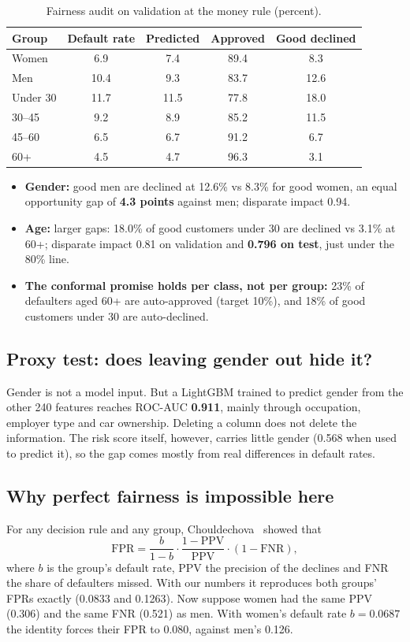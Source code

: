 \documentclass[conference,10pt]{IEEEtran}
\begin{document}
\begin{table}[t]
\centering\small
\caption{Fairness audit on validation at the money rule (percent).}
\label{tab:audit}
\setlength{\tabcolsep}{3pt}
\begin{tabular}{@{}lcccc@{}}
\toprule
Group & Default rate & Predicted & Approved & Good declined \\
\midrule
Women & 6.9 & 7.4 & 89.4 & 8.3 \\
Men & 10.4 & 9.3 & 83.7 & 12.6 \\
\midrule
Under 30 & 11.7 & 11.5 & 77.8 & 18.0 \\
30--45 & 9.2 & 8.9 & 85.2 & 11.5 \\
45--60 & 6.5 & 6.7 & 91.2 & 6.7 \\
60+ & 4.5 & 4.7 & 96.3 & 3.1 \\
\bottomrule
\end{tabular}
\end{table}

\begin{itemize}
\item \textbf{Gender:} good men are declined at 12.6\% vs 8.3\% for good women, an equal
opportunity gap of \textbf{4.3 points} against men; disparate impact 0.94.
\item \textbf{Age:} larger gaps: 18.0\% of good customers under 30 are declined vs 3.1\% at 60+;
disparate impact 0.81 on validation and \textbf{0.796 on test}, just under the 80\% line.
\item \textbf{The conformal promise holds per class, not per group:} 23\% of defaulters aged 60+
are auto-approved (target 10\%), and 18\% of good customers under 30 are auto-declined.
\end{itemize}

\subsection{Proxy test: does leaving gender out hide it?}
Gender is not a model input. But a LightGBM trained to predict gender from the other 240
features reaches ROC-AUC \textbf{0.911}, mainly through occupation, employer type and car
ownership. Deleting a column does not delete the information. The risk score itself, however,
carries little gender (0.568 when used to predict it), so the gap comes mostly from real
differences in default rates.

\subsection{Why perfect fairness is impossible here}
For any decision rule and any group, Chouldechova~\cite{chouldechova2017} showed that
\begin{equation}
\mathrm{FPR} = \frac{b}{1-b} \cdot \frac{1-\mathrm{PPV}}{\mathrm{PPV}} \cdot (1-\mathrm{FNR}),
\end{equation}
where $b$ is the group's default rate, PPV the precision of the declines and FNR the share of
defaulters missed. With our numbers it reproduces both groups' FPRs exactly (0.0833 and
0.1263). Now suppose women had the same PPV (0.306) and the same FNR (0.521) as men. With
women's default rate $b = 0.0687$ the identity forces their FPR to 0.080, against men's 0.126.
\end{document}
